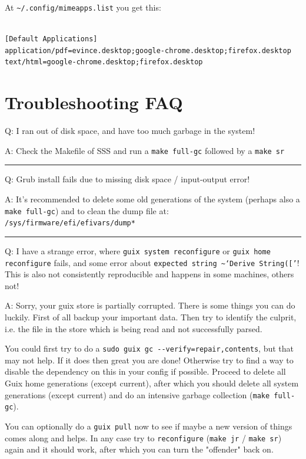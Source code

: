 \documentclass[11pt]{article}
\begin{document}
At \texttt{\textasciitilde{}/.config/mimeapps.list} you get this:
\begin{verbatim}

[Default Applications]
application/pdf=evince.desktop;google-chrome.desktop;firefox.desktop
text/html=google-chrome.desktop;firefox.desktop
\end{verbatim}


\section{Troubleshooting FAQ}
\label{sec:org4e2bab5}

Q: I ran out of disk space, and have too much garbage in the system!

A: Check the Makefile of SSS and run a \texttt{make full-gc} followed by a \texttt{make sr}

\noindent\rule{\textwidth}{0.5pt}

Q: Grub install fails due to missing disk space / input-output error!

A: It's recommended to delete some old generations of the system (perhaps also a \texttt{make full-gc}) and to clean the dump file at: \texttt{/sys/firmware/efi/efivars/dump*}

\noindent\rule{\textwidth}{0.5pt}


Q: I have a strange error, where \texttt{guix system reconfigure} or \texttt{guix home reconfigure} fails, and some error about \texttt{expected string \textasciitilde{}`Derive String(['}! This is also not consistently reproducible and happens in some machines, others not!

A: Sorry, your guix store is partially corrupted. There is some things you can do luckily. First of all backup your important data. Then try to identify the culprit, i.e. the file in the store which is being read and not successfully parsed.

You could first try to do a \texttt{sudo guix gc -{}-{}verify=repair,contents}, but that may not help. If it does then great you are done!
Otherwise try to find a way to disable the dependency on this in your config if possible. Proceed to delete all Guix home generations (except current), after which you should delete all system generations (except current) and do an intensive garbage collection (\texttt{make full-gc}).

You can optionally do a \texttt{guix pull} now to see if maybe a new version of things comes along and helps. In any case try to \texttt{reconfigure} (\texttt{make jr} / \texttt{make sr}) again and it should work, after which you can turn the "offender" back on.
\end{document}
